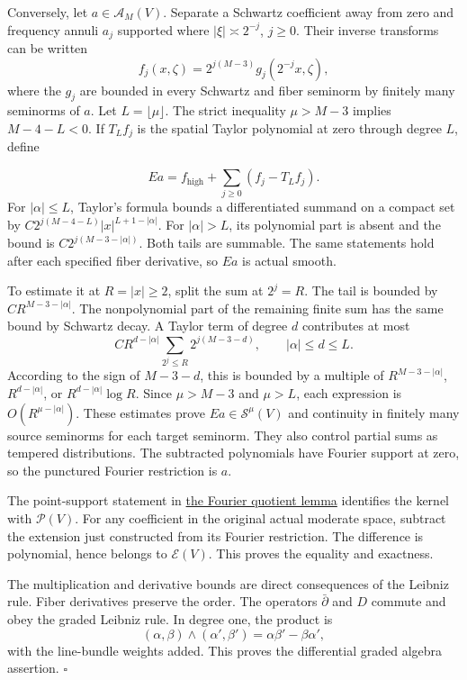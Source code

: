 \documentclass[
  english,
  11pt,
  reqno]{amsart}
\begin{document}
Conversely, let \(a\in\mathscr A_M(V)\). Separate a Schwartz coefficient
away from zero and frequency annuli \(a_j\) supported where
\(|\xi|\asymp2^{-j}\), \(j\ge0\). Their inverse transforms can be
written \[
f_j(x,\zeta)=2^{j(M-3)}g_j(2^{-j}x,\zeta),
\] where the \(g_j\) are bounded in every Schwartz and fiber seminorm by
finitely many seminorms of \(a\). Let \(L=\lfloor\mu\rfloor\). The
strict inequality \(\mu>M-3\) implies \(M-4-L<0\). If \(T_Lf_j\) is the
spatial Taylor polynomial at zero through degree \(L\), define

\label{eq:online-actual-dyadic-extension} \[
Ea=f_{\mathrm{high}}+\sum_{j\ge0}(f_j-T_Lf_j).
\] For \(|\alpha|\le L\), Taylor's formula bounds a differentiated
summand on a compact set by \(C2^{j(M-4-L)}|x|^{L+1-|\alpha|}\). For
\(|\alpha|>L\), its polynomial part is absent and the bound is
\(C2^{j(M-3-|\alpha|)}\). Both tails are summable. The same statements
hold after each specified fiber derivative, so \(Ea\) is actual smooth.

To estimate it at \(R=|x|\ge2\), split the sum at \(2^j=R\). The tail is
bounded by \(CR^{M-3-|\alpha|}\). The nonpolynomial part of the
remaining finite sum has the same bound by Schwartz decay. A Taylor term
of degree \(d\) contributes at most \[
C R^{d-|\alpha|}
\sum_{2^j\le R}2^{j(M-3-d)},
\qquad |\alpha|\le d\le L.
\] According to the sign of \(M-3-d\), this is bounded by a multiple of
\(R^{M-3-|\alpha|}\), \(R^{d-|\alpha|}\), or \(R^{d-|\alpha|}\log R\).
Since \(\mu>M-3\) and \(\mu>L\), each expression is
\(O(R^{\mu-|\alpha|})\). These estimates prove
\(Ea\in\mathscr S^\mu(V)\) and continuity in finitely many source
seminorms for each target seminorm. They also control partial sums as
tempered distributions. The subtracted polynomials have Fourier support
at zero, so the punctured Fourier restriction is \(a\).

The point-support statement in
\hyperref[lem:online-fourier-polynomial-quotient]{the Fourier quotient
lemma} identifies the kernel with \(\mathscr P(V)\). For any coefficient
in the original actual moderate space, subtract the extension just
constructed from its Fourier restriction. The difference is polynomial,
hence belongs to \(\mathscr E(V)\). This proves the equality and
exactness.

The multiplication and derivative bounds are direct consequences of the
Leibniz rule. Fiber derivatives preserve the order. The operators
\(\bar\partial\) and \(D\) commute and obey the graded Leibniz rule. In
degree one, the product is \[
(\alpha,\beta)\wedge(\alpha',\beta')
=\alpha\beta'-\beta\alpha',
\] with the line-bundle weights added. This proves the differential
graded algebra assertion. \hfill\(\square\)
\end{document}
